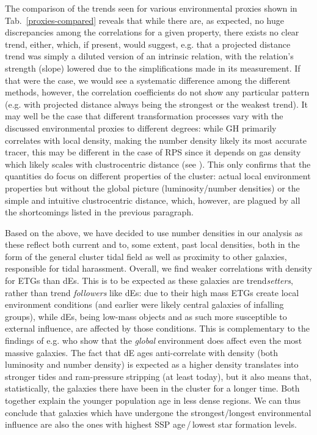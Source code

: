 \documentclass[useAMS,usenatbib]{mn2e}
\begin{document}
The comparison of the trends seen for various environmental proxies shown in Tab.~\ref{proxies-compared} reveals that while there are, as expected, no huge discrepancies among the correlations for a given property, there exists no clear trend, either, which, if present, would suggest, e.g. that a projected distance trend was simply a diluted version of an intrinsic relation, with the relation's strength (slope) lowered due to the simplifications made in its measurement. If that were the case, we would see a systematic difference among the different methods, however, the correlation coefficients do not show any particular pattern (e.g. with projected distance always being the strongest or the weakest trend). It may well be the case that different transformation processes vary with the discussed environmental proxies to different degrees: while GH primarily correlates with local density, making the number density likely its most accurate tracer, this may be different in the case of RPS since it depends on gas density which likely scales with clustrocentric distance (see \citealt{gunn:1972}). This only confirms that the quantities do focus on different properties of the cluster: actual local environment properties but without the global picture (luminosity/number densities) or the simple and intuitive clustrocentric distance, which, however, are plagued by all the shortcomings listed in the previous paragraph. 

Based on the above, we have decided to use number densities in our analysis as these reflect both current and to, some extent, past local densities, both in the form of the general cluster tidal field as well as proximity to other galaxies, responsible for tidal harassment. Overall, we find weaker correlations with density for ETGs than dEs. This is to be expected as these galaxies are trend\textit{setters}, rather than trend \textit{followers} like dEs: due to their high mass ETGs create local environment conditions (and earlier were likely central galaxies of infalling groups), while dEs, being low-mass objects and as such more susceptible to external influence, are affected by those conditions. This is complementary to the findings of e.g. \cite{chung:2007} who show that the \textit{global} environment does affect even the most massive galaxies. The fact that dE ages anti-correlate with density (both luminosity and number density) is expected as a higher density translates into stronger tides and ram-pressure stripping (at least today), but it also means that, statistically, the galaxies there have been in the cluster for a longer time. Both together explain the younger population age in less dense regions. We can thus conclude that galaxies which have undergone the strongest/longest environmental influence are also the ones with highest SSP age\,/\,lowest star formation levels.
\end{document}
